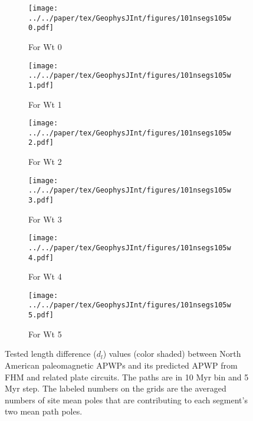 \begin{figure*}
	\centering
	\begin{subfigure}{.495\textwidth}
		\texttt{[image: ../../paper/tex/GeophysJInt/figures/101nsegs105w0.pdf]}
		\caption{For Wt 0}\label{fig-na-dlw0}
	\end{subfigure}
	\vspace{.1em}
	\begin{subfigure}{.495\textwidth}
		\texttt{[image: ../../paper/tex/GeophysJInt/figures/101nsegs105w1.pdf]}
		\caption{For Wt 1}\label{fig-na-dlw1}
	\end{subfigure}
	\vspace{.1em}
	\begin{subfigure}{.495\textwidth}
		\texttt{[image: ../../paper/tex/GeophysJInt/figures/101nsegs105w2.pdf]}
		\caption{For Wt 2}\label{fig-na-dlw2}
	\end{subfigure}
	\vspace{.1em}
	\begin{subfigure}{.495\textwidth}
		\texttt{[image: ../../paper/tex/GeophysJInt/figures/101nsegs105w3.pdf]}
		\caption{For Wt 3}\label{fig-na-dlw3}
	\end{subfigure}
	\vspace{.1em}
	\begin{subfigure}{.495\textwidth}
		\texttt{[image: ../../paper/tex/GeophysJInt/figures/101nsegs105w4.pdf]}
		\caption{For Wt 4}\label{fig-na-dlw4}
	\end{subfigure}
	\vspace{.1em}
	\begin{subfigure}{.495\textwidth}
		\texttt{[image: ../../paper/tex/GeophysJInt/figures/101nsegs105w5.pdf]}
		\caption{For Wt 5}\label{fig-na-dlw5}
	\end{subfigure}
	\caption[$d_l$ of each pair of segments for North American 10/5 Myr
APWPs]{Tested length difference ($d_l$) values (color shaded) between North
American paleomagnetic APWPs and its predicted APWP from FHM and related plate
circuits. The paths are in 10 Myr bin and 5 Myr step. The labeled numbers on the
grids are the averaged numbers of site mean poles that are contributing to each
segment's two mean path poles.}\label{fig-nadl}
\end{figure*}

